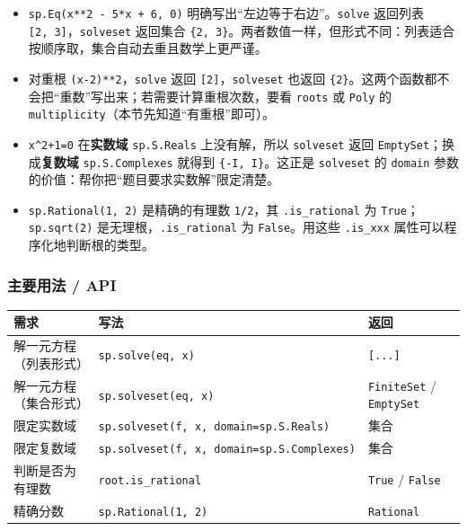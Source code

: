 \begin{itemize}
\tightlist
\item
  \texttt{sp.Eq(x**2\ -\ 5*x\ +\ 6,\ 0)}
  明确写出``左边等于右边''。\texttt{solve} 返回列表
  \texttt{{[}2,\ 3{]}}，\texttt{solveset} 返回集合
  \texttt{\{2,\ 3\}}。两者数值一样，但形式不同：列表适合按顺序取，集合自动去重且数学上更严谨。
\item
  对重根 \texttt{(x-2)**2}，\texttt{solve} 返回
  \texttt{{[}2{]}}，\texttt{solveset} 也返回
  \texttt{\{2\}}。这两个函数都不会把``重数''写出来；若需要计算重根次数，要看
  \texttt{roots} 或 \texttt{Poly} 的
  \texttt{multiplicity}（本节先知道``有重根''即可）。
\item
  \texttt{x\^{}2+1=0} 在\textbf{实数域} \texttt{sp.S.Reals}
  上没有解，所以 \texttt{solveset} 返回
  \texttt{EmptySet}；换成\textbf{复数域} \texttt{sp.S.Complexes} 就得到
  \texttt{\{-I,\ I\}}。这正是 \texttt{solveset} 的 \texttt{domain}
  参数的价值：帮你把``题目要求实数解''限定清楚。
\item
  \texttt{sp.Rational(1,\ 2)} 是精确的有理数 \texttt{1/2}，其
  \texttt{.is\_rational} 为 \texttt{True}；\texttt{sp.sqrt(2)}
  是无理根，\texttt{.is\_rational} 为 \texttt{False}。用这些
  \texttt{.is\_xxx} 属性可以程序化地判断根的类型。
\end{itemize}

\subsubsection{主要用法 / API}\label{ux4e3bux8981ux7528ux6cd5-api-12}

{\def\LTcaptype{none} %
\begin{longtable}[]{@{}
  >{\raggedright\arraybackslash}p{}
  >{\raggedright\arraybackslash}p{}
  >{\raggedright\arraybackslash}p{}@{}}
\toprule\noalign{}
\begin{minipage}[b]{\linewidth}\raggedright
需求
\end{minipage} & \begin{minipage}[b]{\linewidth}\raggedright
写法
\end{minipage} & \begin{minipage}[b]{\linewidth}\raggedright
返回
\end{minipage} \\
\midrule\noalign{}
\endhead
\bottomrule\noalign{}
\endlastfoot
解一元方程（列表形式） & \texttt{sp.solve(eq,\ x)} &
\texttt{{[}...{]}} \\
解一元方程（集合形式） & \texttt{sp.solveset(eq,\ x)} &
\texttt{FiniteSet} / \texttt{EmptySet} \\
限定实数域 & \texttt{sp.solveset(f,\ x,\ domain=sp.S.Reals)} & 集合 \\
限定复数域 & \texttt{sp.solveset(f,\ x,\ domain=sp.S.Complexes)} &
集合 \\
判断是否为有理数 & \texttt{root.is\_rational} & \texttt{True} /
\texttt{False} \\
精确分数 & \texttt{sp.Rational(1,\ 2)} & \texttt{Rational} \\
\end{longtable}
}

